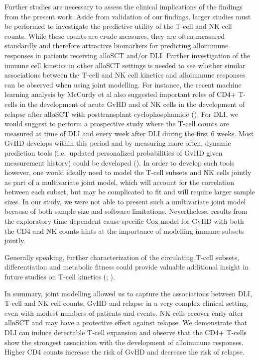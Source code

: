 \documentclass[
  letterpaper,
  paper=240mm:170mm,
  twoside=true,
  open=right,
  fontsize=10pt,
  pagesize=false,
  BCOR=15mm,
  DIV=14,
  headinclude=true,
  footinclude=false,
  headsepline=on]{scrbook}
\begin{document}
Further studies are necessary to assess the clinical implications of the
findings from the present work. Aside from validation of our findings,
larger studies must be performed to investigate the predictive utility
of the T-cell and NK cell counts. While these counts are crude measures,
they are often measured standardly and therefore attractive biomarkers
for predicting alloimmune responses in patients receiving alloSCT and/or
DLI. Further investigation of the immune cell kinetics in other alloSCT
settings is needed to see whether similar associations between the
T-cell and NK cell kinetics and alloimmune responses can be observed
when using joint modelling. For instance, the recent machine learning
analysis by McCurdy et al also suggested important roles of CD4+ T-cells
in the development of acute GvHD and of NK cells in the development of
relapse after alloSCT with posttransplant cyclophosphamide
(). For DLI, we would suggest to perform a prospective study where
the T-cell counts are measured at time of DLI and every week after DLI
during the first 6 weeks. Most GvHD develops within this period and by
measuring more often, dynamic prediction tools (i.e.~updated
personalized probabilities of GvHD given measurement history) could be
developed
(). In order to develop such tools however, one would
ideally need to model the T-cell subsets and NK cells jointly as part of
a multivariate joint model, which will account for the correlation
between each subset, but may be complicated to fit and will require
larger sample sizes. In our study, we were not able to present such a
multivariate joint model because of both sample size and software
limitations. Nevertheless, results from the exploratory time-dependent
cause-specific Cox model for GvHD with both the CD4 and NK counts hints
at the importance of modelling immune subsets jointly.

Generally speaking, further characterization of the circulating T-cell
subsets, differentiation and metabolic fitness could provide valuable
additional insight in future studies on T-cell kinetics
(; ).

In summary, joint modelling allowed us to capture the associations
between DLI, T-cell and NK cell counts, GvHD and relapse in a very
complex clinical setting, even with modest numbers of patients and
events. NK cells recover early after alloSCT and may have a protective
effect against relapse. We demonstrate that DLI can induce detectable
T-cell expansion and observe that the CD4+ T-cells show the strongest
association with the development of alloimmune responses. Higher CD4
counts increase the risk of GvHD and decrease the risk of relapse.
\end{document}
